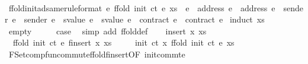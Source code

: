 \begin{isabellebody}
\ \ \isamarkupfalse%
\isanewline
{}\isamarkupfalse%
%
\endisatagproof
{\isafoldproof}%
%
\isadelimproof
\isanewline
%
\endisadelimproof
\isanewline
{}\isamarkupfalse%
\ ffold{\isacharunderscore}{\kern0pt}init{\isacharunderscore}{\kern0pt}ad{\isacharunderscore}{\kern0pt}same{\isacharbrackleft}{\kern0pt}rule{\isacharunderscore}{\kern0pt}format{\isacharbrackright}{\kern0pt}{\isacharcolon}{\kern0pt}\ {\isachardoublequoteopen}{\isasymforall}e{\isacharprime}{\kern0pt}{\isachardot}{\kern0pt}\ ffold\ {\isacharparenleft}{\kern0pt}init\ ct{\isacharparenright}{\kern0pt}\ e\ xs\ {\isacharequal}{\kern0pt}\ e{\isacharprime}{\kern0pt}\ {\isasymlongrightarrow}\ address\ e{\isacharprime}{\kern0pt}\ {\isacharequal}{\kern0pt}\ address\ e\ {\isasymand}\ sender\ e{\isacharprime}{\kern0pt}\ {\isacharequal}{\kern0pt}\ sender\ e\ {\isasymand}\ svalue\ e{\isacharprime}{\kern0pt}\ {\isacharequal}{\kern0pt}\ svalue\ e\ {\isasymand}\ contract\ e{\isacharprime}{\kern0pt}\ {\isacharequal}{\kern0pt}\ contract\ e{\isachardoublequoteclose}\isanewline
%
\isadelimproof
%
\endisadelimproof
%
\isatagproof
{}\isamarkupfalse%
\ {\isacharparenleft}{\kern0pt}induct\ xs{\isacharparenright}{\kern0pt}\isanewline
\ \ \isamarkupfalse%
\ empty\isanewline
\ \ \isamarkupfalse%
\ \isamarkupfalse%
\ {\isacharquery}{\kern0pt}case\ \isamarkupfalse%
\ {\isacharparenleft}{\kern0pt}simp\ add{\isacharcolon}{\kern0pt}\ ffold{\isacharunderscore}{\kern0pt}def{\isacharparenright}{\kern0pt}\isanewline
{}\isamarkupfalse%
\isanewline
\ \ \isamarkupfalse%
\ {\isacharparenleft}{\kern0pt}insert\ x\ xs{\isacharparenright}{\kern0pt}\isanewline
\ \ \isamarkupfalse%
\ \isamarkupfalse%
\ {\isacharasterisk}{\kern0pt}{\isacharcolon}{\kern0pt}\ {\isachardoublequoteopen}ffold\ {\isacharparenleft}{\kern0pt}init\ ct{\isacharparenright}{\kern0pt}\ e\ {\isacharparenleft}{\kern0pt}finsert\ x\ xs{\isacharparenright}{\kern0pt}\ {\isacharequal}{\kern0pt}\isanewline
\ \ \ \ init\ ct\ x\ {\isacharparenleft}{\kern0pt}ffold\ {\isacharparenleft}{\kern0pt}init\ ct{\isacharparenright}{\kern0pt}\ e\ xs{\isacharparenright}{\kern0pt}{\isachardoublequoteclose}\ \isamarkupfalse%
\ FSet{\isachardot}{\kern0pt}comp{\isacharunderscore}{\kern0pt}fun{\isacharunderscore}{\kern0pt}commute{\isachardot}{\kern0pt}ffold{\isacharunderscore}{\kern0pt}finsert{\isacharbrackleft}{\kern0pt}OF\ init{\isacharunderscore}{\kern0pt}commte{\isacharbrackright}{\kern0pt}\ \isamarkupfalse%

\end{isabellebody}
